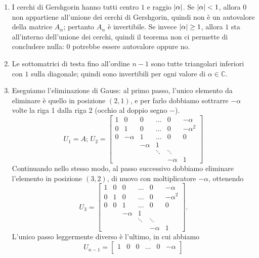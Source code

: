 \documentclass[a4paper]{report}
\DeclarePairedDelimiter{\abs}{\lvert}{\rvert}
\theoremstyle{definition}
\theoremstyle{remark}
\begin{document}
\begin{enumerate}
    \item I cerchi di Gershgorin hanno tutti centro $1$ e raggio $\abs{\alpha}$. Se $\abs{\alpha} < 1$, allora $0$ non appartiene all'unione dei cerchi di Gershgorin, quindi non è un autovalore della matrice $A_\alpha$; pertanto $A_\alpha$ è invertibile. Se invece $\abs{\alpha} \geq 1$, allora $1$ sta all'interno dell'unione dei cerchi, quindi il teorema non ci permette di concludere nulla: $0$ potrebbe essere autovalore oppure no.
    \item Le sottomatrici di testa fino all'ordine $n-1$ sono tutte triangolari inferiori con $1$ sulla diagonale; quindi sono invertibili per ogni valore di $\alpha\in\mathbb{C}$.
    \item Eseguiamo l'eliminazione di Gauss: al primo passo, l'unico elemento da eliminare è quello in posizione $(2,1)$, e per farlo dobbiamo sottrarre $-\alpha$ volte la riga 1 dalla riga 2 (occhio al doppio segno $-$).
    \[
        U_1 = A; \, U_2 = \begin{bmatrix}
            1  & 0 &  0& \dots  & 0 &  -\alpha\\
            0 & 1 & 0 & \dots & 0 & -\alpha^2\\
            0& -\alpha & 1 & \dots  & 0 & 0\\
            & & -\alpha & 1\\
            & & & \ddots & \ddots & \\
            & & &  &-\alpha & 1      
        \end{bmatrix}
    \]
    Continuando nello stesso modo, al passo successivo dobbiamo eliminare l'elemento in posizione $(3,2)$, di nuovo con moltiplicatore $-\alpha$, ottenendo
    \[
        U_3 = \begin{bmatrix}
            1  & 0 &  0& \dots  & 0 &  -\alpha\\
            0 & 1 & 0 & \dots & 0 & -\alpha^2\\
            0& 0 & 1 & \dots  & 0 & 0\\
            & & -\alpha & 1\\
            & & & \ddots & \ddots & \\
            & & &  &-\alpha & 1      
        \end{bmatrix}.
    \]
    L'unico passo leggermente diverso è l'ultimo, in cui abbiamo
    \[
        U_{n-1} = \begin{bmatrix}
            1  & 0 &  0& \dots  & 0 &  -\alpha\\

\end{bmatrix}\]
\end{enumerate}
\end{document}
